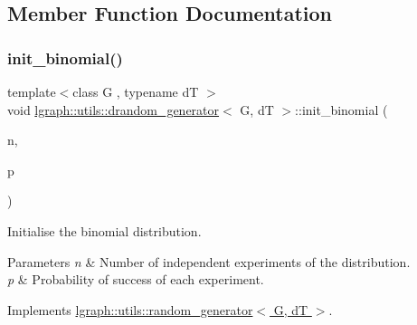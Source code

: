 \subsection{Member Function Documentation}
\mbox{\label{classlgraph_1_1utils_1_1drandom__generator_acae17810176a40fdfd8a4a260892361e}} 
\subsubsection{\texorpdfstring{init\+\_\+binomial()}{init\_binomial()}}
{\footnotesize\ttfamily template$<$class G , typename dT $>$ \\
void \hyperlink{classlgraph_1_1utils_1_1drandom__generator}{lgraph\+::utils\+::drandom\+\_\+generator}$<$ G, dT $>$\+::init\+\_\+binomial (\begin{DoxyParamCaption}\item[{dT}]{n,  }\item[{double}]{p }\end{DoxyParamCaption})\hspace{0.3cm}{\ttfamily [virtual]}}



Initialise the binomial distribution. 


\begin{DoxyParams}{Parameters}
{\em n} & Number of independent experiments of the distribution. \\
\hline
{\em p} & Probability of success of each experiment. \\
\hline
\end{DoxyParams}


Implements \hyperlink{classlgraph_1_1utils_1_1random__generator_a71976e6ecbbd49de85ac270085832df1}{lgraph\+::utils\+::random\+\_\+generator$<$ G, d\+T $>$}.

\mbox{\label{classlgraph_1_1utils_1_1drandom__generator_a38c5b5c981d635aac32f632a0f4a0092}} 
